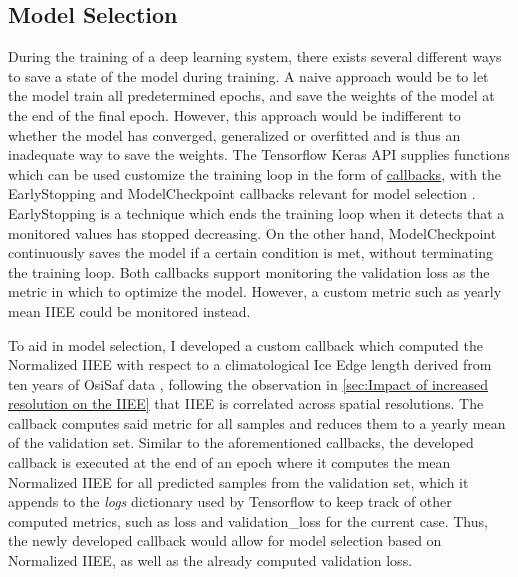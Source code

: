 \subsection{Model Selection}
During the training of a deep learning system, there exists several different ways to save a state of the model during training. A naive approach would be to let the model train all predetermined epochs, and save the weights of the model at the end of the final epoch. However, this approach would be indifferent to whether the model has converged, generalized or overfitted and is thus an inadequate way to save the weights. The Tensorflow Keras API supplies functions which can be used customize the training loop in the form of \href{https://www.tensorflow.org/api_docs/python/tf/keras/callbacks}{callbacks}, with the EarlyStopping and ModelCheckpoint callbacks relevant for model selection \cite{tensorflow2015-whitepaper}. EarlyStopping is a technique which ends the training loop when it detects that a monitored values has stopped decreasing. On the other hand, ModelCheckpoint continuously saves the model if a certain condition is met, without terminating the training loop. Both callbacks support monitoring the validation loss as the metric in which to optimize the model. However, a custom metric such as yearly mean IIEE \cite{Goessling2016} could be monitored instead. 

To aid in model selection, I developed a custom callback which computed the Normalized IIEE with respect to a climatological Ice Edge length derived from ten years of OsiSaf data , following the observation in \ref{sec:Impact of increased resolution on the IIEE} that IIEE is correlated across spatial resolutions. The callback computes said metric for all samples and reduces them to a yearly mean of the validation set. Similar to the aforementioned callbacks, the developed callback is executed at the end of an epoch where it computes the mean Normalized IIEE for all predicted samples from the validation set, which it appends to the \textit{logs} dictionary used by Tensorflow to keep track of other computed metrics, such as loss and validation\_loss for the current case. Thus, the newly developed callback would allow for model selection based on Normalized IIEE, as well as the already computed validation loss.

